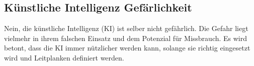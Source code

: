 \subsection{Künstliche Intelligenz Gefärlichkeit}

Nein, die künstliche Intelligenz (KI) ist selber nicht gefährlich. Die Gefahr liegt vielmehr in ihrem falschen Einsatz und dem Potenzial für Missbrauch. Es wird betont, dass die KI immer nützlicher werden kann, solange sie richtig eingesetzt wird und Leitplanken definiert werden. \citep{ai-wikipedia}